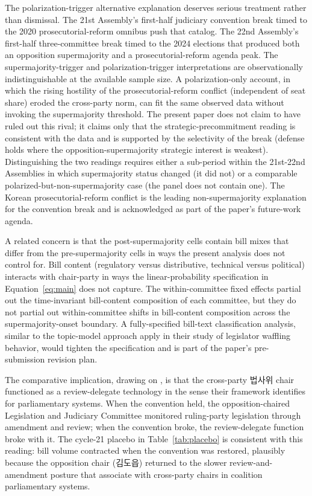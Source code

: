 \documentclass[11pt]{article}
\begin{document}
The polarization-trigger alternative explanation deserves serious treatment rather than dismissal. The 21st Assembly's first-half judiciary convention break timed to the 2020 prosecutorial-reform omnibus push that \citet{leekim2022} catalog. The 22nd Assembly's first-half three-committee break timed to the 2024 elections that produced both an opposition supermajority and a prosecutorial-reform agenda peak. The supermajority-trigger and polarization-trigger interpretations are observationally indistinguishable at the available sample size. A polarization-only account, in which the rising hostility of the prosecutorial-reform conflict (independent of seat share) eroded the cross-party norm, can fit the same observed data without invoking the supermajority threshold. The present paper does not claim to have ruled out this rival; it claims only that the strategic-precommitment reading is consistent with the data and is supported by the selectivity of the break (defense holds where the opposition-supermajority strategic interest is weakest). Distinguishing the two readings requires either a sub-period within the 21st-22nd Assemblies in which supermajority status changed (it did not) or a comparable polarized-but-non-supermajority case (the panel does not contain one). The Korean prosecutorial-reform conflict is the leading non-supermajority explanation for the convention break and is acknowledged as part of the paper's future-work agenda.

A related concern is that the post-supermajority cells contain bill mixes that differ from the pre-supermajority cells in ways the present analysis does not control for. Bill content (regulatory versus distributive, technical versus political) interacts with chair-party in ways the linear-probability specification in Equation~\ref{eq:main} does not capture. The within-committee fixed effects partial out the time-invariant bill-content composition of each committee, but they do not partial out within-committee shifts in bill-content composition across the supermajority-onset boundary. A fully-specified bill-text classification analysis, similar to the topic-model approach \citet{kangpark2025} apply in their study of legislator waffling behavior, would tighten the specification and is part of the paper's pre-submission revision plan.

The comparative implication, drawing on \citet{fmv2017}, is that the cross-party 법사위 chair functioned as a review-delegate technology in the sense their framework identifies for parliamentary systems. When the convention held, the opposition-chaired Legislation and Judiciary Committee monitored ruling-party legislation through amendment and review; when the convention broke, the review-delegate function broke with it. The cycle-21 placebo in Table~\ref{tab:placebo} is consistent with this reading: bill volume contracted when the convention was restored, plausibly because the opposition chair (김도읍) returned to the slower review-and-amendment posture that \citet{fmv2017} associate with cross-party chairs in coalition parliamentary systems.
\end{document}
